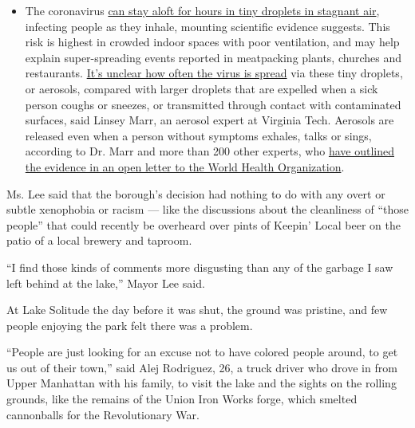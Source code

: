 \begin{itemize}
  \begin{itemize}
  \tightlist
  \item
    The coronavirus
    \href{https://www.nytimes.com/2020/07/04/health/239-experts-with-one-big-claim-the-coronavirus-is-airborne.html?action=click\&pgtype=Article\&state=default\&region=MAIN_CONTENT_3\&context=storylines_faq}{can
    stay aloft for hours in tiny droplets in stagnant air}, infecting
    people as they inhale, mounting scientific evidence suggests. This
    risk is highest in crowded indoor spaces with poor ventilation, and
    may help explain super-spreading events reported in meatpacking
    plants, churches and restaurants.
    \href{https://www.nytimes.com/2020/07/06/health/coronavirus-airborne-aerosols.html?action=click\&pgtype=Article\&state=default\&region=MAIN_CONTENT_3\&context=storylines_faq}{It's
    unclear how often the virus is spread} via these tiny droplets, or
    aerosols, compared with larger droplets that are expelled when a
    sick person coughs or sneezes, or transmitted through contact with
    contaminated surfaces, said Linsey Marr, an aerosol expert at
    Virginia Tech. Aerosols are released even when a person without
    symptoms exhales, talks or sings, according to Dr. Marr and more
    than 200 other experts, who
    \href{https://academic.oup.com/cid/article/doi/10.1093/cid/ciaa939/5867798}{have
    outlined the evidence in an open letter to the World Health
    Organization}.
  \end{itemize}
\end{itemize}

Ms. Lee said that the borough's decision had nothing to do with any
overt or subtle xenophobia or racism --- like the discussions about the
cleanliness of ``those people'' that could recently be overheard over
pints of Keepin' Local beer on the patio of a local brewery and taproom.

``I find those kinds of comments more disgusting than any of the garbage
I saw left behind at the lake,'' Mayor Lee said.

At Lake Solitude the day before it was shut, the ground was pristine,
and few people enjoying the park felt there was a problem.

``People are just looking for an excuse not to have colored people
around, to get us out of their town,'' said Alej Rodriguez, 26, a truck
driver who drove in from Upper Manhattan with his family, to visit the
lake and the sights on the rolling grounds, like the remains of the
Union Iron Works forge, which smelted cannonballs for the Revolutionary
War.

